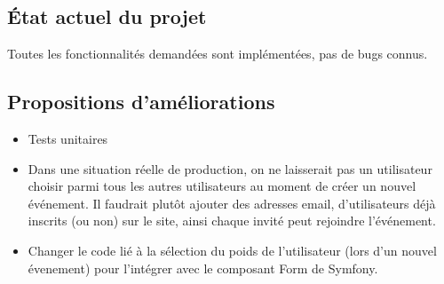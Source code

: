 \documentclass[a4paper, 12pt]{article}
\begin{document}
\subsection{État actuel du projet}
Toutes les fonctionnalités demandées sont implémentées, pas de bugs connus.

\subsection{Propositions d'améliorations}
\begin{itemize}
	\item Tests unitaires
	\item Dans une situation réelle de production, on ne laisserait pas un utilisateur choisir parmi tous les autres 
			utilisateurs au moment de créer un nouvel événement. Il faudrait plutôt ajouter des adresses email, 
			d'utilisateurs déjà inscrits (ou non) sur le site, ainsi chaque invité peut rejoindre l'événement.
	\item Changer le code lié à la sélection du poids de l'utilisateur (lors d'un nouvel évenement) pour l'intégrer 
			avec le composant Form de Symfony.
\end{itemize}
\end{document}
